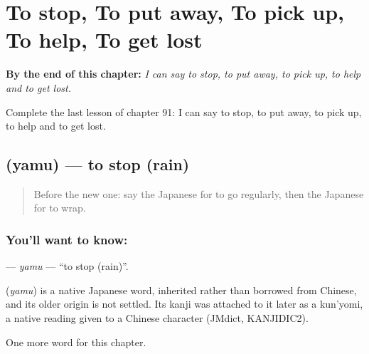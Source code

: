 
\chapter{To stop, To put away, To pick up, To help, To get lost}
\label{ch:ja-to-stop-to-put-away-to-pick-up-to-help-to-get-lost}

\begin{chapteropening}
\textbf{By the end of this chapter:} \emph{I can say to stop, to put away, to pick up, to help and to get lost.}

Complete the last lesson of chapter 91: I can say to stop, to put away, to pick up, to help and to get lost.
\end{chapteropening}

\section[\texorpdfstring{\ja{やむ} (yamu)}{やむ (yamu)}]{ (yamu) — to stop (rain)}

\label{lesson:JA-C91-yamu}



\begin{quote}
Before the new one: say the Japanese for to go regularly, then the Japanese for to wrap.
\end{quote}

\subsection*{You'll want to know: }
\textbf{} — \emph{yamu} — \textquotedblleft{}to stop (rain)\textquotedblright{}.

\begin{cousinweb}
\textbf{} (\emph{yamu}) is a native Japanese word, inherited rather than borrowed from Chinese, and its older origin is not settled. Its kanji was attached to it later as a kun'yomi, a native reading given to a Chinese character (JMdict, KANJIDIC2).
\end{cousinweb}

\begin{grammarlens}[title={What you've built}]
One more word for this chapter.
\end{grammarlens}

